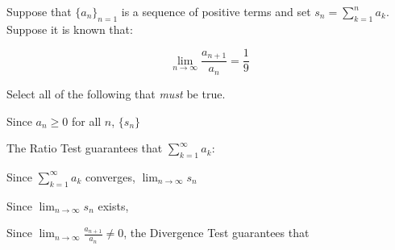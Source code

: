\documentclass{ximera}
\author{Jim Talamo}
\begin{document}
\begin{exercise}
Suppose that $\{a_n\}_{n=1}$ is a sequence of positive terms and set $s_n = \sum_{k=1}^n a_k$.  Suppose it is known that:

\[
\lim_{n \to \infty} \frac{a_{n+1}}{a_n} = \frac{1}{9}
\]


Select all of the following that \emph{must} be true.

\begin{selectAll}
\end{selectAll}

\begin{hint}
Since $a_n \geq 0$ for all $n$, $\{s_n\}$
\begin{multipleChoice}
\end{multipleChoice}

The Ratio Test guarantees that $\sum_{k=1}^{\infty} a_k$:

\begin{multipleChoice}
\end{multipleChoice}


\begin{question}

Since $\sum_{k=1}^{\infty} a_k$ converges, $\lim_{n \to \infty} s_n$
\begin{multipleChoice}
\end{multipleChoice}

\begin{question}
Since $\lim_{n \to \infty} s_n$ exists,
\begin{multipleChoice}
\end{multipleChoice}

\end{question}
\end{question}

Since $\lim_{n \to \infty} \frac{a_{n+1}}{a_n} \neq 0$, the Divergence Test guarantees that

\begin{multipleChoice}
\end{multipleChoice}

\end{hint}

\end{exercise}
\end{document}
